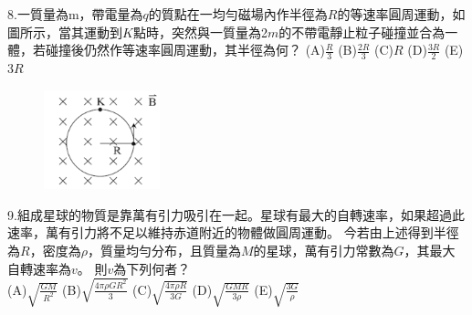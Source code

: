 \documentclass[cn,10pt,math=newtx,chinesefont=founder,device=ig]{elegantbook}
\begin{document}
\newpage

\begin{example}
   8.一質量為m，帶電量為$q$的質點在一均勻磁場內作半徑為$R$的等速率圓周運動，如圖所示，當其運動到$K$點時，突然與一質量為2$m$的不帶電靜止粒子碰撞並合為一體，若碰撞後仍然作等速率圓周運動，其半徑為何？
   (A)$\frac{R}{3}$ (B)$\frac{2R}{3}$ (C)$R$ (D)$\frac{3R}{2}$ (E)$3R$
   \\
    \rightline{[成德高中教甄109]}
\end{example}
\begin{solution}
    
\end{solution}
\begin{figure}[htbp]
    \flushright
    \includegraphics[width=0.3\textwidth]{image/109成德8.png}
  \end{figure}
\newpage

\begin{example}
   9.組成星球的物質是靠萬有引力吸引在一起。星球有最大的自轉速率，如果超過此速率，萬有引力將不足以維持赤道附近的物體做圓周運動。
   今若由上述得到半徑為$R$，密度為$\rho$，質量均勻分布，且質量為$M$的星球，萬有引力常數為$G$，其最大自轉速率為$v$。
   則$v$為下列何者？\\
   (A)$\sqrt{\frac{GM}{R^2}}$ (B)$\sqrt{\frac{4 \pi \rho G R^2}{3}}$ 
   (C)$\sqrt{\frac{4 \pi \rho  R}{3G}}$ (D)$\sqrt{\frac{GMR}{3 \rho}}$ (E)$\sqrt{\frac{3G}{\rho}}$
   \\
    \rightline{[成德高中教甄109]}
\end{example}
\begin{solution}
    
\end{solution}

\newpage
\end{document}
